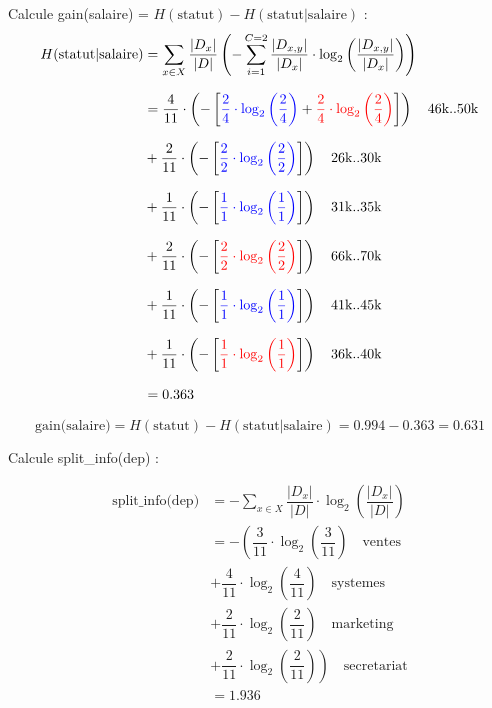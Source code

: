 \documentclass{article}
\begin{document}
Calcule gain(salaire) = $H(\text{statut}) - H(\text{statut} | \text{salaire})$ :
\begin{align*}
    H(\text{statut} | \text{salaire}) &= \sum_{x\in X} \dfrac{|D_x|}{|D|} \left( - \sum_{i=1} ^{C=2} \dfrac{|D_{x,y}|}{|D_x|} \cdot \log_2 \left( \dfrac{|D_{x,y}|}{|D_x|} \right) \right)\\[0.25cm]
                                  &= \dfrac{4}{11} \cdot \left( - \left[ \textcolor{blue}{\dfrac{2}{4} \cdot \log_2\left (\dfrac{2}{4} \right)} +   \textcolor{red}{\dfrac{2}{4} \cdot \log_2\left (\dfrac{2}{4} \right)} \right]  \right) \quad \text{46k..50k}\\[0.25cm]
                                  &+ \dfrac{2}{11} \cdot \left( - \left[ \textcolor{blue}{\dfrac{2}{2} \cdot \log_2\left (\dfrac{2}{2} \right)}  \right]  \right) \quad \text{26k..30k}\\[0.25cm]
                                  &+ \dfrac{1}{11} \cdot \left( - \left[ \textcolor{blue}{\dfrac{1}{1} \cdot \log_2\left (\dfrac{1}{1} \right)}  \right]  \right) \quad \text{31k..35k}\\[0.25cm]
                                  &+ \dfrac{2}{11} \cdot \left( - \left[ \textcolor{red}{\dfrac{2}{2} \cdot \log_2\left (\dfrac{2}{2} \right)}  \right]  \right) \quad \text{66k..70k}\\[0.25cm]
                                  &+ \dfrac{1}{11} \cdot \left( - \left[ \textcolor{blue}{\dfrac{1}{1} \cdot \log_2\left (\dfrac{1}{1} \right)}  \right]  \right) \quad \text{41k..45k}\\[0.25cm]
                                  &+ \dfrac{1}{11} \cdot \left( - \left[ \textcolor{red}{\dfrac{1}{1} \cdot \log_2\left (\dfrac{1}{1} \right)}  \right]  \right) \quad \text{36k..40k}\\[0.25cm]
                                  & = 0.363
\end{align*}


\vspace{-0.15cm}

\[\text{gain(salaire)} = H(\text{statut}) - H(\text{statut} | \text{salaire}) = 0.994 - 0.363 = 0.631\]

\newpage

Calcule split\_info(dep) :


\begin{align*}
    \text{split\_info(dep)} &= - \sum_{x \in X} \dfrac{|D_x|}{|D|} \cdot \log_2\left( \dfrac{|D_x|}{|D|} \right) \\[0.25cm]
                            &= - \left( \dfrac{3}{11} \cdot  \log_2\left( \dfrac{3}{11} \right) \quad \text{ventes} \right. \\[0.25cm]
                            &+ \dfrac{4}{11} \cdot  \log_2\left( \dfrac{4}{11} \right) \quad \text{systemes} \\[0.25cm]
                            &+ \dfrac{2}{11} \cdot  \log_2\left( \dfrac{2}{11} \right) \quad \text{marketing} \\[0.25cm]
                            &+ \left. \dfrac{2}{11} \cdot  \log_2\left( \dfrac{2}{11} \right)\right) \quad \text{secretariat}  \\[0.25cm]
                            & = 1.936
\end{align*}
\end{document}
